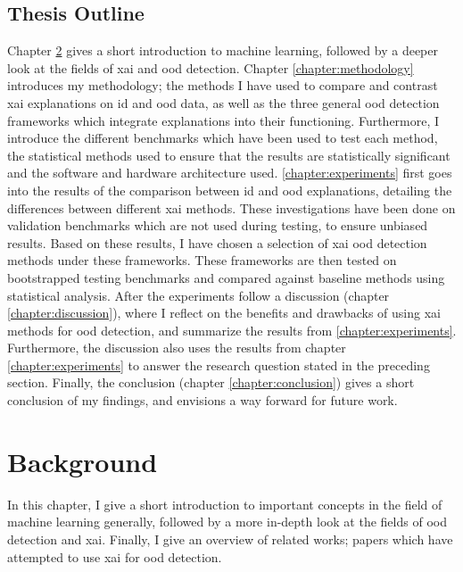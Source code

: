 \documentclass[UKenglish]{uiomasterthesis} %
\theoremstyle{definition}
\begin{document}
\section{Thesis Outline}

Chapter \ref{chapter:background} gives a short introduction to machine learning, followed by a deeper look at the fields of \ac{xai} and \ac{ood} detection. Chapter \ref{chapter:methodology} introduces my methodology; the methods I have used to compare and contrast \ac{xai} explanations on \ac{id} and \ac{ood} data, as well as the three general \ac{ood} detection frameworks which integrate explanations into their functioning. Furthermore, I introduce the different benchmarks which have been used to test each method, the statistical methods used to ensure that the results are statistically significant and the software and hardware architecture used. \ref{chapter:experiments} first goes into the results of the comparison between \ac{id} and \ac{ood} explanations, detailing the differences between different \ac{xai} methods. These investigations have been done on validation benchmarks which are not used during testing, to ensure unbiased results. Based on these results, I have chosen a selection of \ac{xai} \ac{ood} detection methods under these frameworks. These frameworks are then tested on bootstrapped testing benchmarks and compared against baseline methods using statistical analysis. After the experiments follow a discussion (chapter \ref{chapter:discussion}), where I reflect on the benefits and drawbacks of using \ac{xai} methods for \ac{ood} detection, and summarize the results from \ref{chapter:experiments}. Furthermore, the discussion also uses the results from chapter \ref{chapter:experiments} to answer the research question stated in the preceding section. Finally, the conclusion (chapter \ref{chapter:conclusion}) gives a short conclusion of my findings, and envisions a way forward for future work.

\chapter{Background} \label{chapter:background}

In this chapter, I give a short introduction to important concepts in the field of machine learning generally, followed by a more in-depth look at the fields of \ac{ood} detection and \ac{xai}. Finally, I give an overview of related works; papers which have attempted to use \ac{xai} for \ac{ood} detection.
\end{document}
